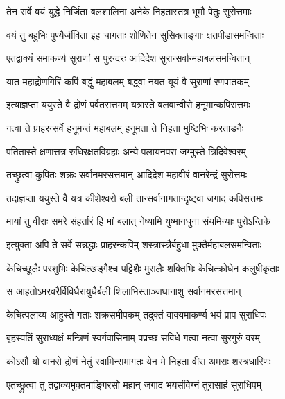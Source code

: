 \twolineshloka
{तेन सर्वे वयं युद्धे निर्जिता बलशालिना}
{अनेके निहतास्तत्र भूमौ पेतुः सुरोत्तमाः}%

\twolineshloka
{वयं तु बहुभिः पुण्यैर्जीविता इह चागताः}
{शोणितेन सुसिक्ताङ्गाः क्षतपीडासमन्विताः}%

\twolineshloka
{एतद्वाक्यं समाकर्ण्य सुराणां स पुरन्दरः}
{आदिदेश सुरान्सर्वान्महाबलसमन्वितान्}%

\twolineshloka
{यात महाद्रोणगिरिं कपिं बद्धुं महाबलम्}
{बद्ध्वा नयत यूयं वै सुराणां रणपातकम्}%

\twolineshloka
{इत्याज्ञप्ता ययुस्ते वै द्रोणं पर्वतसत्तमम्}
{यत्रास्ते बलवान्वीरो हनूमान्कपिसत्तमः}%

\twolineshloka
{गत्वा ते प्राहरन्सर्वे हनूमन्तं महाबलम्}
{हनूमता ते निहता मुष्टिभिः करताडनैः}%

\twolineshloka
{पतितास्ते क्षणात्तत्र रुधिरक्षतविग्रहाः}
{अन्ये पलायनपरा जग्मुस्ते त्रिदिवेश्वरम्}%

\twolineshloka
{तच्छ्रुत्वा कुपितः शक्रः सर्वानमरसत्तमान्}
{आदिदेश महावीरं वानरेन्द्रं सुरोत्तमः}%

\twolineshloka
{तदाज्ञप्ता ययुस्ते वै यत्र कीशेश्वरो बली}
{तान्सर्वानागतान्दृष्ट्वा जगाद कपिसत्तमः}%

\twolineshloka
{मायां तु वीराः समरे संहर्तारं हि मां बलात्}
{नेष्यामि युष्मानधुना संयमिन्याः पुरोऽन्तिके}%

\twolineshloka
{इत्युक्ता अपि ते सर्वे सन्नद्धाः प्राहरन्कपिम्}
{शस्त्रास्त्रैर्बहुधा मुक्तैर्महाबलसमन्विताः}%

\twolineshloka
{केचिच्छूलैः परशुभिः केचित्खड्गैश्च पट्टिशैः}
{मुसलैः शक्तिभिः केचित्क्रोधेन कलुषीकृताः}%

\twolineshloka
{स आहतोऽमरवरैर्विविधैरायुधैर्बली}
{शिलाभिस्ताञ्जघानाशु सर्वानमरसत्तमान्}%

\twolineshloka
{केचित्पलाय्य आहुस्ते गताः शक्रसमीपकम्}
{तदुक्तं वाक्यमाकर्ण्य भयं प्राप सुराधिपः}%

\twolineshloka
{बृहस्पतिं सुराध्यक्षं मन्त्रिणं स्वर्गवासिनाम्}
{पप्रच्छ सविधे गत्वा नत्वा सुरगुरुं वरम्}%


\twolineshloka
{कोऽसौ यो वानरो द्रोणं नेतुं स्वामिन्समागतः}
{येन मे निहता वीरा अमराः शस्त्रधारिणः}%


\twolineshloka
{एतच्छ्रुत्वा तु तद्वाक्यमुक्तमाङ्गिरसो महान्}
{जगाद भयसंविग्नं तुरासाहं सुराधिपम्}%


